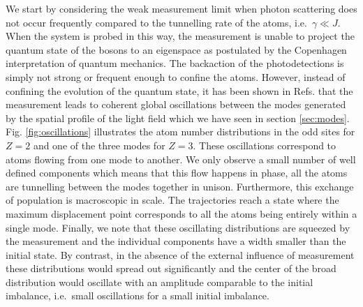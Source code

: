 We start by considering the weak measurement limit when photon
scattering does not occur frequently compared to the tunnelling rate
of the atoms, i.e.~$\gamma \ll J$. When the system is probed in this
way, the measurement is unable to project the quantum state of the
bosons to an eigenspace as postulated by the Copenhagen interpretation
of quantum mechanics. The backaction of the photodetections is simply
not strong or frequent enough to confine the atoms. However, instead
of confining the evolution of the quantum state, it has been shown in
Refs. \cite{mazzucchi2016, mazzucchi2016njp} that the measurement
leads to coherent global oscillations between the modes generated by
the spatial profile of the light field which we have seen in section
\ref{sec:modes}. Fig. \ref{fig:oscillations} illustrates the atom
number distributions in the odd sites for $Z = 2$ and one of the three
modes for $Z = 3$. These oscillations correspond to atoms flowing from
one mode to another. We only observe a small number of well defined
components which means that this flow happens in phase, all the atoms
are tunnelling between the modes together in unison. Furthermore, this
exchange of population is macroscopic in scale. The trajectories reach
a state where the maximum displacement point corresponds to all the
atoms being entirely within a single mode. Finally, we note that these
oscillating distributions are squeezed by the measurement and the
individual components have a width smaller than the initial state. By
contrast, in the absence of the external influence of measurement
these distributions would spread out significantly and the center of
the broad distribution would oscillate with an amplitude comparable to
the initial imbalance, i.e.~small oscillations for a small initial
imbalance.

